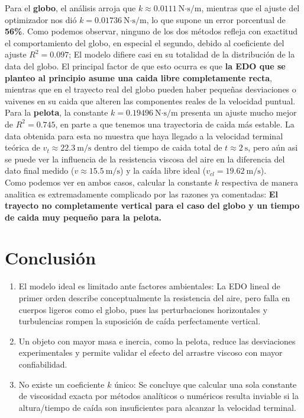 \documentclass[12pt, journal]{IEEEtran}
\begin{document}
	Para el \textbf{globo}, el análisis arroja que $k \approx 0.0111~\text{N·s/m}$, mientras que el ajuste
	del optimizador nos dió  $k = 0.01736~\text{N·s/m}$, lo que supone un error porcentual de \textbf{56\%}. Como
	podemos observar, ninguno de los dos métodos refleja con exactitud el comportamiento del globo, en especial el segundo, debido
	al coeficiente del ajuste $R^2 = 0.097$; El modelo difiere casi en su totalidad de la distribución de la data del globo.
	El principal factor de que esto ocurra es que \textbf{la EDO que se planteo al principio asume una caida libre completamente recta},
	mientras que en el trayecto real del globo pueden haber pequeñas desviaciones o vaivenes en su caida que alteren las componentes reales de la velocidad puntual.
	\\
	Para la \textbf{pelota}, la constante $k = 0.19496~\text{N·s/m}$ presenta un ajuste mucho mejor de $R^2 = 0.745$, en parte a que tenemos una trayectoria de caida más estable.
	La data obtenida para esta no muestra que haya llegado a la velocidad terminal teórica de $v_t \approx 22.3~\text{m/s}$ dentro del tiempo de caida total
	de $t \approx 2~\text{s}$, pero aún asi se puede
	ver la influencia de la resistencia viscosa del aire en la diferencia del dato final medido ($v \approx 15.5~\text{m/s}$)
	y la caída libre ideal ($v_{cl} = 19.62~\text{m/s}$).\\
	Como podemos ver en ambos casos, calcular la constante $k$ respectiva de manera analitica es extremadamente complicado
	por las razones ya comentadas: \textbf{El trayecto no completamente vertical para el caso del globo y un tiempo de caida muy pequeño para la pelota.}

	\section{Conclusión}
	\begin{enumerate}
		\item El modelo ideal es limitado ante factores ambientales:
		La EDO lineal de primer orden describe conceptualmente la resistencia del aire, pero falla en cuerpos ligeros como el globo, pues las perturbaciones horizontales y turbulencias rompen la suposición de caída perfectamente vertical.
		\item Un objeto con mayor masa e inercia, como la pelota, reduce las desviaciones experimentales y permite validar el efecto del arrastre viscoso con mayor confiabilidad.
		\item No existe un coeficiente $k$ único: Se concluye que calcular una sola constante de viscosidad exacta por métodos analíticos o numéricos resulta inviable si la altura/tiempo de caída son insuficientes para alcanzar la velocidad terminal.
	\end{enumerate}
\end{document}
